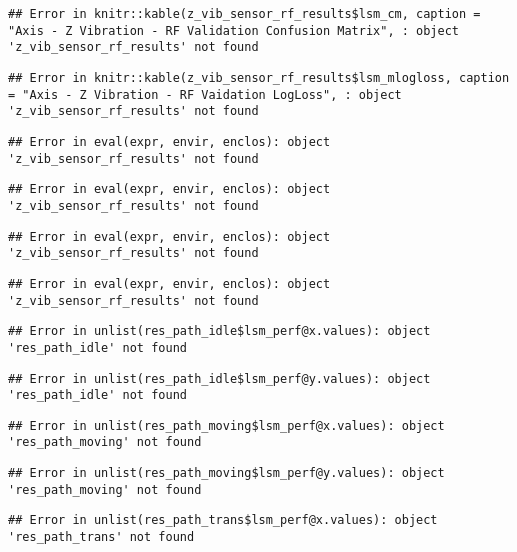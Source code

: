 \documentclass[]{article}
\begin{document}
\begin{verbatim}
## Error in knitr::kable(z_vib_sensor_rf_results$lsm_cm, caption = "Axis - Z Vibration - RF Validation Confusion Matrix", : object 'z_vib_sensor_rf_results' not found
\end{verbatim}

\begin{verbatim}
## Error in knitr::kable(z_vib_sensor_rf_results$lsm_mlogloss, caption = "Axis - Z Vibration - RF Vaidation LogLoss", : object 'z_vib_sensor_rf_results' not found
\end{verbatim}

\begin{verbatim}
## Error in eval(expr, envir, enclos): object 'z_vib_sensor_rf_results' not found
\end{verbatim}

\begin{verbatim}
## Error in eval(expr, envir, enclos): object 'z_vib_sensor_rf_results' not found
\end{verbatim}

\begin{verbatim}
## Error in eval(expr, envir, enclos): object 'z_vib_sensor_rf_results' not found
\end{verbatim}

\begin{verbatim}
## Error in eval(expr, envir, enclos): object 'z_vib_sensor_rf_results' not found
\end{verbatim}

\begin{verbatim}
## Error in unlist(res_path_idle$lsm_perf@x.values): object 'res_path_idle' not found
\end{verbatim}

\begin{verbatim}
## Error in unlist(res_path_idle$lsm_perf@y.values): object 'res_path_idle' not found
\end{verbatim}

\begin{verbatim}
## Error in unlist(res_path_moving$lsm_perf@x.values): object 'res_path_moving' not found
\end{verbatim}

\begin{verbatim}
## Error in unlist(res_path_moving$lsm_perf@y.values): object 'res_path_moving' not found
\end{verbatim}

\begin{verbatim}
## Error in unlist(res_path_trans$lsm_perf@x.values): object 'res_path_trans' not found
\end{verbatim}
\end{document}
